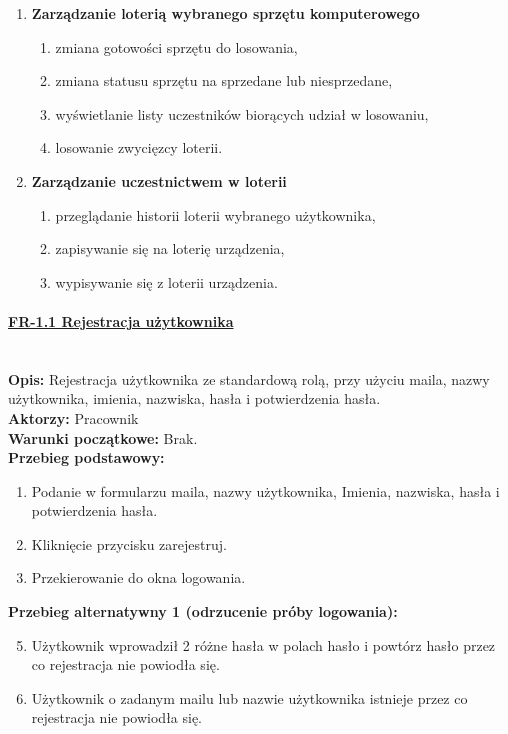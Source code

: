 \begin{enumerate}[label={\textbf{FR}-\bfseries\arabic*}]
		
		\item \textbf{Zarządzanie loterią wybranego sprzętu komputerowego}
		\begin{enumerate}[label={FR-\arabic{enumi}.\arabic*},noparskip]
        \item zmiana gotowości sprzętu do losowania,
        \item zmiana statusu sprzętu na sprzedane lub niesprzedane,
				\item wyświetlanie listy uczestników biorących udział w losowaniu,
        \item losowanie zwycięzcy loterii.
    \end{enumerate}
		
		\item \textbf{Zarządzanie uczestnictwem w loterii}
			\begin{enumerate}[label={FR-\arabic{enumi}.\arabic*},noparskip]
        \item przeglądanie historii loterii wybranego użytkownika,
        \item zapisywanie się na loterię urządzenia,
				\item wypisywanie się z loterii urządzenia.
    \end{enumerate}
\end{enumerate}

\paragraph{\underline{FR-1.1 Rejestracja użytkownika}}\mbox{}\\[1mm]
	\noindent\textbf{Opis:} Rejestracja użytkownika ze standardową rolą, przy użyciu maila, nazwy użytkownika, imienia, nazwiska, hasła i potwierdzenia hasła.\\
	\noindent\textbf{Aktorzy:} Pracownik\\
	\textbf{Warunki początkowe:} Brak.\\
	\textbf{Przebieg podstawowy:}
	\begin{enumerate}[noparskip]
		\item Podanie w formularzu maila, nazwy użytkownika, Imienia, nazwiska, hasła i potwierdzenia hasła.
    \item Kliknięcie przycisku zarejestruj.
		\item Przekierowanie do okna logowania.
	\end{enumerate}
	\textbf{Przebieg alternatywny 1 (odrzucenie próby logowania):}
	\begin{enumerate}[noparskip]\setcounter{enumi}{4}
		\item Użytkownik wprowadził 2 różne hasła w polach hasło i powtórz hasło przez co rejestracja nie powiodła się.
		\item Użytkownik o zadanym mailu lub nazwie użytkownika istnieje przez co rejestracja nie powiodła się.
	\end{enumerate}	\mbox{}\\[-11mm]

